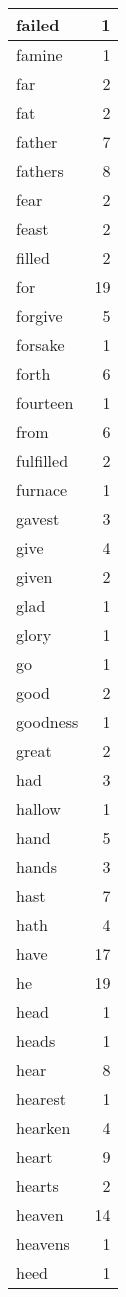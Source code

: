 \begin{center}
\begin{longtable}{l|r}
failed & 1 \\ \hline
famine & 1 \\ \hline
far & 2 \\ \hline
fat & 2 \\ \hline
father & 7 \\ \hline
fathers & 8 \\ \hline
fear & 2 \\ \hline
feast & 2 \\ \hline
filled & 2 \\ \hline
for & 19 \\ \hline
forgive & 5 \\ \hline
forsake & 1 \\ \hline
forth & 6 \\ \hline
fourteen & 1 \\ \hline
from & 6 \\ \hline
fulfilled & 2 \\ \hline
furnace & 1 \\ \hline
gavest & 3 \\ \hline
give & 4 \\ \hline
given & 2 \\ \hline
glad & 1 \\ \hline
glory & 1 \\ \hline
go & 1 \\ \hline
good & 2 \\ \hline
goodness & 1 \\ \hline
great & 2 \\ \hline
had & 3 \\ \hline
hallow & 1 \\ \hline
hand & 5 \\ \hline
hands & 3 \\ \hline
hast & 7 \\ \hline
hath & 4 \\ \hline
have & 17 \\ \hline
he & 19 \\ \hline
head & 1 \\ \hline
heads & 1 \\ \hline
hear & 8 \\ \hline
hearest & 1 \\ \hline
hearken & 4 \\ \hline
heart & 9 \\ \hline
hearts & 2 \\ \hline
heaven & 14 \\ \hline
heavens & 1 \\ \hline
heed & 1 \\ \hline

\end{longtable}
\end{center}
